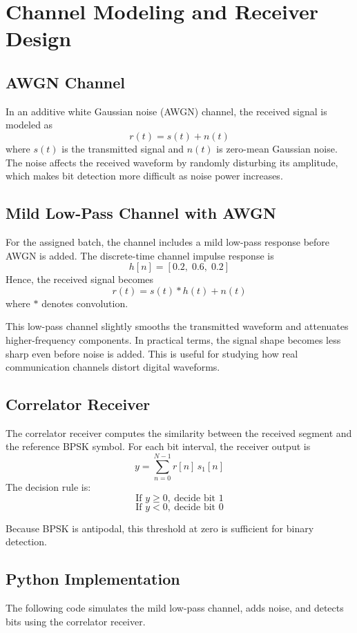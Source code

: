 \chapter{Channel Modeling and Receiver Design}

\section{AWGN Channel}
In an additive white Gaussian noise (AWGN) channel, the received signal is modeled as
\[
r(t)=s(t)+n(t)
\]
where \(s(t)\) is the transmitted signal and \(n(t)\) is zero-mean Gaussian noise. The noise affects the received waveform by randomly disturbing its amplitude, which makes bit detection more difficult as noise power increases.

\section{Mild Low-Pass Channel with AWGN}
For the assigned batch, the channel includes a mild low-pass response before AWGN is added. The discrete-time channel impulse response is
\[
h[n]=[0.2,\;0.6,\;0.2]
\]
Hence, the received signal becomes
\[
r(t)=s(t)*h(t)+n(t)
\]
where \(*\) denotes convolution.

This low-pass channel slightly smooths 
the transmitted waveform and attenuates higher-frequency components. 
In practical terms, the signal shape becomes less sharp even before noise is added. 
This is useful for studying how real communication channels distort digital waveforms.

\section{Correlator Receiver}
The correlator receiver computes the similarity between the received segment and the reference BPSK symbol. For each bit interval, the receiver output is
\[
y=\sum_{n=0}^{N-1} r[n]\,s_1[n]
\]
The decision rule is:
\[
\text{If } y \geq 0,\ \text{decide bit }1
\]
\[
\text{If } y < 0,\ \text{decide bit }0
\]

Because BPSK is antipodal, this threshold at zero is sufficient for binary detection.

\section{Python Implementation}
The following code simulates the mild low-pass channel, adds noise, and detects bits using the correlator receiver.

